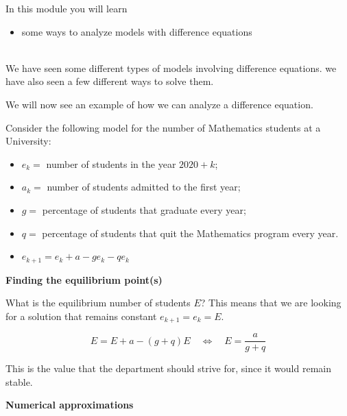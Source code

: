 In this module you will learn
\begin{itemize}
	\item some ways to analyze models with difference equations
\end{itemize}

\hfill \\




We have seen some different types of models involving difference equations. we have also seen a few different ways to solve them.

We will now see an example of how we can analyze a difference equation.



\begin{example}

Consider the following model for the number of Mathematics students at a University:
\begin{itemize}
\item $e_k = $ number of students in the year $2020+k$;
\item $a_k = $ number of students admitted to the first year;
\item $g = $ percentage of students that graduate every year;
\item $q = $ percentage of students that quit the Mathematics program  every year. \\

\item $e_{k+1} = e_k + a - g e_k - q e_k$
\end{itemize}

\end{example}

\hfill

\begin{center}
\textbf{\color{cyan}
Finding the equilibrium point(s)
}
\end{center}


What is the equilibrium number of students $E$? This means that we are looking for a solution that remains constant $e_{k+1}=e_k = E$.

$$
E = E + a - (g+q)E
\quad \Leftrightarrow\quad
	E = \frac{a}{g+q}
$$

This is the value that the department should strive for, since it would remain stable.


\hfill

\begin{center}
\textbf{\color{cyan}
Numerical approximations
}
\end{center}



